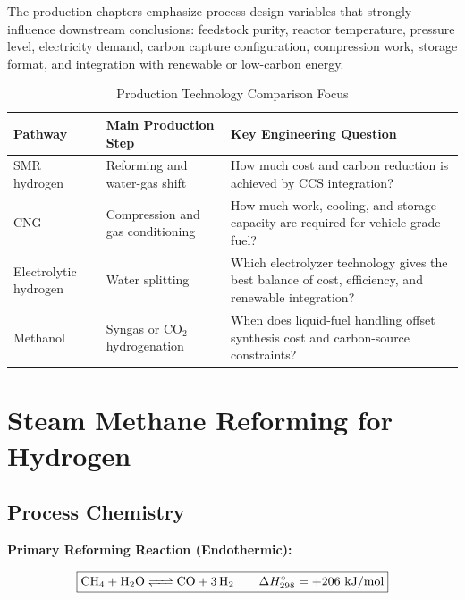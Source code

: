 \documentclass[12pt,twoside,openany]{book}
\begin{document}
The production chapters emphasize process design variables that strongly influence downstream conclusions: feedstock purity, reactor temperature, pressure level, electricity demand, carbon capture configuration, compression work, storage format, and integration with renewable or low-carbon energy.

\begin{table}[htbp]
    \centering
    \caption{Production Technology Comparison Focus}
    \label{tab:part2_focus}
    \begin{tabular}{L{3.5cm} L{3.5cm} L{5cm}}
    \hline
    \textbf{Pathway} & \textbf{Main Production Step} & \textbf{Key Engineering Question} \\
    \hline
    SMR hydrogen & Reforming and water-gas shift & How much cost and carbon reduction is achieved by CCS integration? \\
    CNG & Compression and gas conditioning & How much work, cooling, and storage capacity are required for vehicle-grade fuel? \\
    Electrolytic hydrogen & Water splitting & Which electrolyzer technology gives the best balance of cost, efficiency, and renewable integration? \\
    Methanol & Syngas or CO$_2$ hydrogenation & When does liquid-fuel handling offset synthesis cost and carbon-source constraints? \\
    \hline
    \end{tabular}
\end{table}


\chapter{Steam Methane Reforming for Hydrogen}

\section{Process Chemistry}

\textbf{Primary Reforming Reaction (Endothermic):}

\begin{dmath}
\boxed{\ce{CH4 + H2O <=> CO + 3H2}
      \qquad \Delta H^\circ_{298} = +206\text{ kJ/mol}}
\end{dmath}
\end{document}
